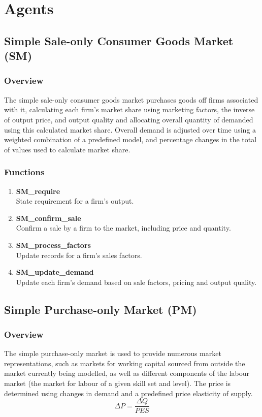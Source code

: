 \documentclass[11pt]{article}
\begin{document}
\tableofcontents

\section{Agents}

\subsection{Simple Sale-only Consumer Goods Market (SM)}

\subsubsection{Overview}
The simple sale-only consumer goods market purchases goods off firms associated with it, calculating each firm's market share using marketing factors, the inverse of output price, and output quality and allocating overall quantity of demanded using this calculated market share. Overall demand is adjusted over time using a weighted combination of a predefined model, and percentage changes in the total of values used to calculate market share.

\subsubsection{Functions}
\begin{enumerate}
	\item \textbf{SM\_require} \\
	State requirement for a firm's output.
	\item \textbf{SM\_confirm\_sale} \\
	Confirm a sale by a firm to the market, including price and quantity.
	\item \textbf{SM\_process\_factors} \\
	Update records for a firm's sales factors.
	\item \textbf{SM\_update\_demand} \\
	Update each firm's demand based on sale factors, pricing and output quality.
\end{enumerate}

\subsection{Simple Purchase-only Market (PM)}

\subsubsection{Overview}
The simple purchase-only market is used to provide numerous market representations, such as markets for working capital sourced from outside the market currently being modelled, as well as different components of the labour market (the market for labour of a given skill set and level). The price is determined using changes in demand and a predefined price elasticity of supply.
\[
	\Delta P = \frac{\Delta Q}{PES}
\] 
\end{document}
